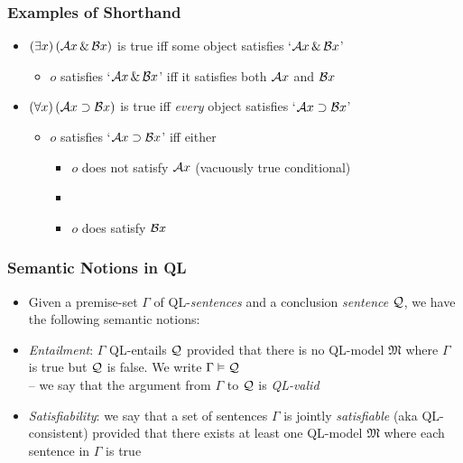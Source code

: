 \begin{frame}
  \frametitle{Examples of Shorthand}
\large 
  \begin{itemize}
    \item $(\exists x)\,(\mathcal{A}x \,\&\, \mathcal{B}x)$ is true iff \textcolor{OGlyallpink}{some} object satisfies `$\mathcal{A}x \,\&\, \mathcal{B}x$'
    \begin{itemize}
      \item $o$ satisfies `$\mathcal{A}x \,\&\, \mathcal{B}x$' iff it satisfies both $\mathcal{A}x$ and $\mathcal{B}x$
    \end{itemize}
    
\bigskip

    \item $(\forall x)\,(\mathcal{A}x \supset \mathcal{B}x)$ is true iff \emph{every} object satisfies `$\mathcal{A}x \supset \mathcal{B}x$'
    \medskip
    \begin{itemize} 
    \large 
      \item $o$ satisfies `$\mathcal{A}x \supset \mathcal{B}x$' iff
      either
      \bigskip
      \begin{itemize}  
      \normalsize
        \item $o$ does not satisfy $\mathcal{A}x$ (vacuously true conditional)
        \item[] 
        \item $o$ does satisfy $\mathcal{B}x$
      \end{itemize}
       \bigskip
    \end{itemize}
  \end{itemize}
\end{frame}


\begin{frame}
\frametitle{Semantic Notions in QL}

\begin{itemize}[<+->]

\item Given a premise-set $\Gamma$ of QL-\textit{sentences} and a conclusion \textit{sentence} $\mathcal{Q}$, we have the following semantic notions:

\item \emph{Entailment}: $\Gamma$ QL-entails $\mathcal{Q}$ provided that there is no QL-model $\mathfrak{M}$ where $\Gamma$ is true but $\mathcal{Q}$ is false. We write $\Gamma \vDash \mathcal{Q}$ \\ -- we say that the argument from $\Gamma$ to $\mathcal{Q}$ is \emph{QL-valid}

\item  \emph{Satisfiability}: we say that a set of sentences $\Gamma$ is jointly \emph{satisfiable} (aka QL-consistent) provided that there exists at least one QL-model $\mathfrak{M}$ where each sentence in $\Gamma$ is true 



\end{itemize}
\end{frame}

